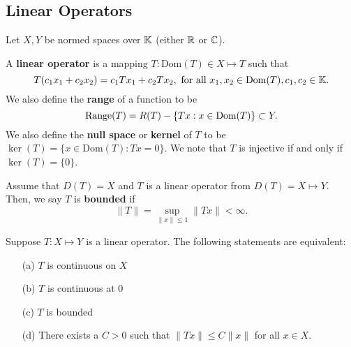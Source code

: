 \subsection*{Linear Operators}
Let $X, Y$ be normed spaces over $\mathbb{K}$ (either ${\mathbb R}$ or ${\mathbb C}$).
\begin{definition}
A \textbf{linear operator} is a mapping $T: \text{Dom}(T) \in X \mapsto T$ such that 
\[ T(c_1 x_1 + c_2 x_2) = c_1 T x_1 + c_2 T x_2, \text{ for all } x_1, x_2 \in \text{Dom}(T), c_1, c_2 \in \mathbb{K}.\]
We also define the \textbf{range} of a function to be
\[ \text{Range}(T) = R(T) - \{ Tx : x \in \text{Dom}(T) \} \subset Y.\] 
We also define the \textbf{null space} or \textbf{kernel}  of $T$ to be $\ker(T) = \{ x \in \text{Dom}(T) : Tx = 0 \}$. We note that $T$ is injective if and only if $\ker(T) = \{ 0 \}$.
\end{definition}
\begin{definition}
Assume that $D(T) = X$ and $T$ is a linear operator from $D(T) = X \mapsto Y$. Then, we say $T$ is \textbf{bounded} if 
\[ \| T \| = \sup\limits_{\| x \| \leq 1} \| T x\| < \infty. \]
\end{definition}
\begin{theorem}
Suppose $T: X \mapsto Y$ is a linear operator. The following statements are equivalent:
\begin{enumerate}
\item[(a)] $T$ is continuous on $X$
\item[(b)] $T$ is continuous at $0$
\item[(c)] $T$ is bounded
\item[(d)] There exists a $C > 0$ such that $\| Tx \| \leq C \| x \|$ for all $x \in X$. 
\end{enumerate}
\end{theorem}

